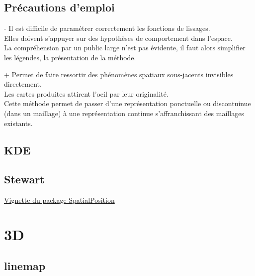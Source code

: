 \documentclass[]{book}
\begin{document}
\subsection{Précautions d'emploi}\label{precautions-demploi-5}

- Il est difficile de paramétrer correctement les fonctions de
lissages.\\
Elles doivent s'appuyer sur des hypothèses de comportement dans
l'espace.\\
La compréhension par un public large n'est pas évidente, il faut alors
simplifier les légendes, la présentation de la méthode.

+ Permet de faire ressortir des phénomènes spatiaux sous-jacents
invisibles directement.\\
Les cartes produites attirent l'oeil par leur originalité.\\
Cette méthode permet de passer d'une représentation ponctuelle ou
discontuinue (dans un maillage) à une représentation continue
s'affranchissant des maillages existants.

\subsection{KDE}\label{kde}

\subsection{Stewart}\label{stewart}

\href{https://cran.r-project.org/web/packages/SpatialPosition/vignettes/StewartExample.html}{Vignette
du package SpatialPosition}

\section{3D}\label{d}

\subsection{linemap}\label{linemap}
\end{document}
